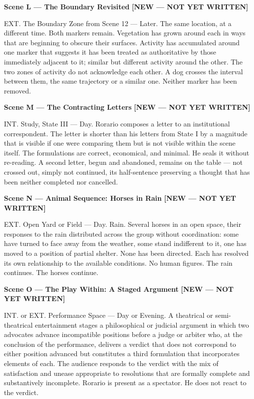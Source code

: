 \documentclass[12pt, oneside]{amsart}
\newcommand{\statusnew}{{\small\bfseries\color{newscene}[NEW --- NOT YET WRITTEN]}}
\begin{document}
\bigskip

\noindent\textbf{Scene L --- The Boundary Revisited} \statusnew

\noindent EXT. The Boundary Zone from Scene 12 --- Later. The same location, at a different time. Both markers remain. Vegetation has grown around each in ways that are beginning to obscure their surfaces. Activity has accumulated around one marker that suggests it has been treated as authoritative by those immediately adjacent to it; similar but different activity around the other. The two zones of activity do not acknowledge each other. A dog crosses the interval between them, the same trajectory or a similar one. Neither marker has been removed.

\bigskip

\noindent\textbf{Scene M --- The Contracting Letters} \statusnew

\noindent INT. Study, State III --- Day. Rorario composes a letter to an institutional correspondent. The letter is shorter than his letters from State I by a magnitude that is visible if one were comparing them but is not visible within the scene itself. The formulations are correct, economical, and minimal. He seals it without re-reading. A second letter, begun and abandoned, remains on the table --- not crossed out, simply not continued, its half-sentence preserving a thought that has been neither completed nor cancelled.

\bigskip

\noindent\textbf{Scene N --- Animal Sequence: Horses in Rain} \statusnew

\noindent EXT. Open Yard or Field --- Day. Rain. Several horses in an open space, their responses to the rain distributed across the group without coordination: some have turned to face away from the weather, some stand indifferent to it, one has moved to a position of partial shelter. None has been directed. Each has resolved its own relationship to the available conditions. No human figures. The rain continues. The horses continue.

\bigskip

\noindent\textbf{Scene O --- The Play Within: A Staged Argument} \statusnew

\noindent INT. or EXT. Performance Space --- Day or Evening. A theatrical or semi-theatrical entertainment stages a philosophical or judicial argument in which two advocates advance incompatible positions before a judge or arbiter who, at the conclusion of the performance, delivers a verdict that does not correspond to either position advanced but constitutes a third formulation that incorporates elements of each. The audience responds to the verdict with the mix of satisfaction and unease appropriate to resolutions that are formally complete and substantively incomplete. Rorario is present as a spectator. He does not react to the verdict.
\end{document}

